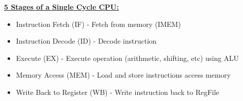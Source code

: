 \begin{blocksection}
\question
\textbf{\underline{5 Stages of a Single Cycle CPU:}}

\begin{itemize}
    \item Instruction Fetch (IF) - Fetch from memory (IMEM) 
    \item Instruction Decode (ID) - Decode instruction
    \item Execute (EX) - Execute operation (arithmetic, shifting, etc) using ALU
    \item Memory Access (MEM) - Load and store instructions access memory
    \item Write Back to Register (WB) - Write instruction back to RegFile
\end{itemize}

\end{blocksection}